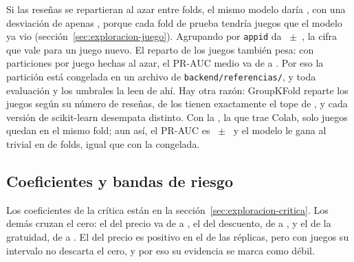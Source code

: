 Si las reseñas se repartieran al azar entre folds, el mismo modelo daría \cifraPRAUCKFold{}, con
una desviación de apenas \cifraPRAUCKFoldStd{}, porque cada fold de prueba tendría juegos que el
modelo ya vio (sección~\ref{sec:exploracion-juego}). Agrupando por \texttt{appid} da
\cifraPRAUCModelo{}~$\pm$~\cifraPRAUCModeloStd{}, la cifra que vale para un juego nuevo. El reparto
de los juegos también pesa: con \cifraParticionesAleatorias{} particiones por juego hechas al azar,
el PR-AUC medio va de \cifraPRAUCParticionMin{} a \cifraPRAUCParticionMax{}. Por eso la partición
está congelada en un archivo de \texttt{backend/referencias/}, y toda evaluación y los umbrales la
leen de ahí. Hay otra razón: GroupKFold reparte los juegos según su número de reseñas,
\cifraJuegosEmpatadosEnElTope{} de los \cifraJuegosEntrenamiento{} tienen exactamente el tope de
\cifraTopeIngesta{}, y cada versión de scikit-learn desempata distinto. Con la
\cifraVersionSklearnColab{}, la que trae Colab, solo \cifraJuegosMismoFoldColab{} juegos quedan en
el mismo fold; aun así, el PR-AUC es
\cifraPRAUCParticionAlternativa{}~$\pm$~\cifraPRAUCParticionAlternativaStd{} y el modelo le gana
al trivial en \cifraPliegosGanadosAlternativa{} de \cifraPliegues{} folds, igual que con la
congelada.

\subsection{Coeficientes y bandas de riesgo}\label{sec:modelacion-bootstrap}\label{sec:modelacion-umbrales}

Los coeficientes de la crítica están en la sección~\ref{sec:exploracion-critica}. Los demás cruzan
el cero: el del precio va de \cifraCoefPrecioICInf{} a \cifraCoefPrecioICSup{}, el del descuento,
de \cifraCoefDescuentoICInf{} a \cifraCoefDescuentoICSup{}, y el de la gratuidad, de
\cifraCoefGratisICInf{} a \cifraCoefGratisICSup{}. El del precio es positivo en el
\cifraCoefPrecioReplicasPositivas{} de las réplicas, pero con \cifraJuegosEntrenamiento{} juegos su
intervalo no descarta el cero, y por eso su evidencia se marca como débil.

